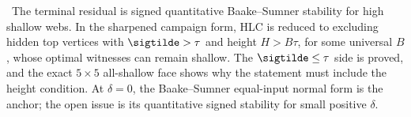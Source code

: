 \begin{openproblem}
\openbadge\  The terminal residual is signed quantitative Baake--Sumner
stability for high shallow webs.  In the sharpened campaign form, HLC is
reduced to excluding hidden top vertices with \(\sigtilde>\tau\) and height
\(H>B\tau\), for some universal \(B\), whose optimal witnesses can remain
shallow.  The \(\sigtilde\leq\tau\) side is proved, and the exact \(5\times5\)
all-shallow face shows why the statement must include the height condition.
At \(\delta=0\), the Baake--Sumner equal-input normal form is the anchor; the
open issue is its quantitative signed stability for small positive
\(\delta\).
\end{openproblem}
